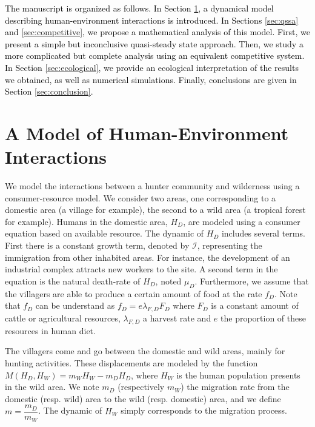 \documentclass{article}
\newcommand{\lfd}{\lambda_{F, D}}
\newcommand{\cI}{\mathcal{I}}
\newcommand{\YD}[1]{\textcolor{magenta}{#1}}
\newcommand{\vdeux}[1]{\textcolor{black}{#1}}
\newcommand{\vtrois}[1]{\textcolor{black}{#1}}
\theoremstyle{definition}
\theoremstyle{remark}
\begin{document}

\vdeux{
The manuscript is organized as follows. In Section \ref{sec:model}, a dynamical model describing human-environment interactions is \vtrois{introduced}. In Sections \ref{sec:qssa} and \ref{sec:competitive}, we propose a mathematical analysis of this model. First, we present a simple but inconclusive quasi-steady state approach. Then, we \vtrois{study} a more complicated but complete analysis using an equivalent competitive system. In Section \ref{sec:ecological}, we provide an ecological interpretation of the results we obtained, as well as numerical simulations. Finally, conclusions are given in Section \ref{sec:conclusion}.
}

\section{A Model of Human-Environment Interactions} \label{sec:model}
We model the interactions between a hunter community and wilderness using a consumer-resource model. We consider two areas, one corresponding to a domestic area (a village for example), the second to a wild area (a tropical forest for example). Humans in the domestic area, $H_D$, are modeled using a consumer equation based on available resource. The dynamic of $H_D$ includes several terms. First there is a constant growth term, denoted by $\cI$, representing the immigration from other inhabited areas. For instance, the development of an industrial complex attracts new workers to the site. A second term in the equation is the natural death-rate of $H_D$, noted $\mu_D$. Furthermore, we assume that the villagers are able to produce a certain amount of food at the rate $f_D$. Note that $f_D$ can be understand as $f_D = e \lfd F_D$ where $F_D$ is a constant amount of cattle or agricultural resources, $\lfd$ a harvest rate and $e$ the proportion of these resources in human diet. 

The villagers come and go between the domestic and wild areas, mainly for hunting activities. These displacements are modeled by the function $M(H_D, H_W) = m_W H_W - m_D H_D$, where $H_W$ is the human population presents in the wild area. We note $m_D$ (respectively $m_W$) the migration rate from the domestic (resp. wild) area to the wild (resp. domestic) area, and we define $m = \dfrac{m_D}{m_W}$. The dynamic of $H_W$ simply corresponds to the migration process. 
\end{document}
